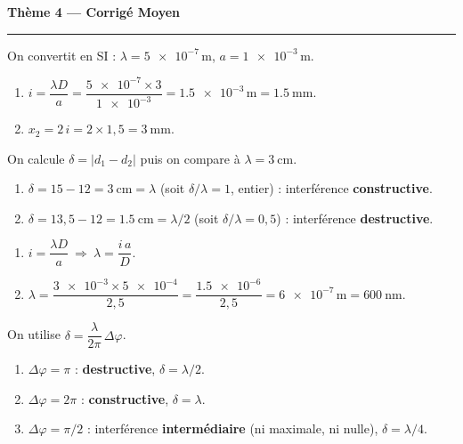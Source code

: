 \documentclass[11pt,a4paper]{article}
\begin{document}
\begin{center}
{\large\bfseries\color{excol} Thème 4 — Corrigé Moyen}\\[-2pt]
{\color{excol}\rule{5cm}{1pt}}
\end{center}

\begin{corrige}
On convertit en SI : $\lambda=\num{5e-7}\,\si{\metre}$, $a=\num{1e-3}\,\si{\metre}$.
\begin{enumerate}[label=\alph*)]
  \item $i=\dfrac{\lambda D}{a}=\dfrac{\num{5e-7}\times 3}{\num{1e-3}}
        =\num{1.5e-3}\,\si{\metre}=\SI{1.5}{\milli\metre}.$
  \item $x_2=2\,i=2\times 1{,}5=\SI{3}{\milli\metre}.$
\end{enumerate}
\end{corrige}

\begin{corrige}
On calcule $\delta=|d_1-d_2|$ puis on compare à $\lambda=\SI{3}{\centi\metre}$.
\begin{enumerate}[label=\alph*)]
  \item $\delta=15-12=\SI{3}{\centi\metre}=\lambda$ (soit $\delta/\lambda=1$, entier) :
        interférence \textbf{constructive}.
  \item $\delta=13{,}5-12=\SI{1.5}{\centi\metre}=\lambda/2$ (soit $\delta/\lambda=0{,}5$) :
        interférence \textbf{destructive}.
\end{enumerate}
\end{corrige}

\begin{corrige}
\begin{enumerate}[label=\alph*)]
  \item $i=\dfrac{\lambda D}{a}\ \Rightarrow\ \lambda=\dfrac{i\,a}{D}.$
  \item $\lambda=\dfrac{\num{3e-3}\times\num{5e-4}}{2{,}5}
        =\dfrac{\num{1.5e-6}}{2{,}5}=\num{6e-7}\,\si{\metre}=\SI{600}{\nano\metre}.$
\end{enumerate}
\end{corrige}

\begin{corrige}
On utilise $\delta=\dfrac{\lambda}{2\pi}\,\Delta\varphi$.
\begin{enumerate}[label=\alph*)]
  \item $\Delta\varphi=\pi$ : \textbf{destructive}, $\delta=\lambda/2$.
  \item $\Delta\varphi=2\pi$ : \textbf{constructive}, $\delta=\lambda$.
  \item $\Delta\varphi=\pi/2$ : interférence \textbf{intermédiaire} (ni maximale, ni nulle),
        $\delta=\lambda/4$.
\end{enumerate}
\end{corrige}
\end{document}
